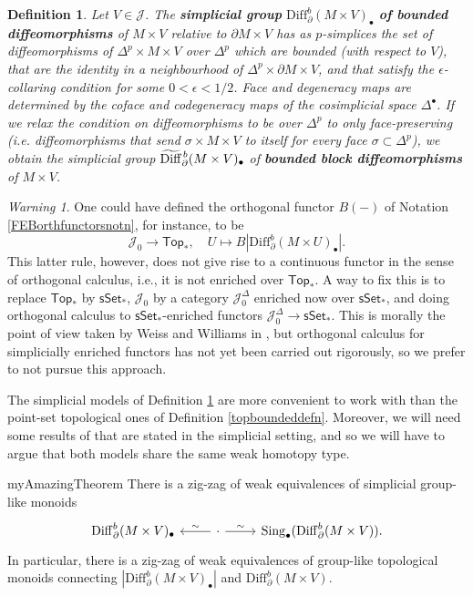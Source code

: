 \documentclass[a4paper, oneside]{amsart}
\newcommand{\diff}{\mathrm{Diff}}
\newcommand{\1}{\mathds{1}}
\newcommand{\Sing}{\operatorname{Sing}}
\newcommand{\sSet}{\mathsf{sSet}}
\newcommand{\Top}{\mathsf{Top}}
\newtheorem{defn}[thm]{Definition}
\theoremstyle{remark}
\newtheorem{warn}[thm]{Warning}
\theoremstyle{definition}
\newcommand{\bdiffb}{\widetilde{\mathrm{Diff}}{\vphantom{\mathrm{Diff}}}^{\hspace{1pt}b}}
\numberwithin{equation}{section}
\begin{document}
\begin{defn}\label{simplicialboundeddefn}
Let $V\in \mathcal J$. The \textbf{simplicial group} $\diff_\partial^b(M\times V)_\bullet$ \textbf{of bounded diffeomorphisms} of $M\times V$ relative to $\partial M\times V$ has as $p$-simplices the set of diffeomorphisms of $\Delta^p\times M\times V$ over $\Delta^p$ which are bounded (with respect to $V$), that are the identity in a neighbourhood of $\Delta^p\times \partial M\times V$, and that satisfy the $\epsilon$-collaring condition for some $0<\epsilon<1/2$. Face and degeneracy maps are determined by the coface and codegeneracy maps of the cosimplicial space $\Delta^\bullet$. If we relax the condition on diffeomorphisms to be over $\Delta^p$ to only face-preserving (i.e. diffeomorphisms that send $\sigma\times M\times V$ to itself for every face $\sigma\subset\Delta^p$), we obtain the simplicial group $\bdiffb_\partial(M\times V)_\bullet$ of \textbf{bounded block diffeomorphisms} of $M\times V$.
\end{defn}


\begin{warn}
    One could have defined the orthogonal functor $B(-)$ of Notation \ref{FEBorthfunctorsnotn}, for instance, to be
    $$
\mathcal J_0\longrightarrow \Top_*, \quad U\longmapsto B|\diff_\partial^b(M\times U)_\bullet|.
$$
This latter rule, however, does not give rise to a continuous functor in the sense of orthogonal calculus, i.e., it is not enriched over $\Top_*$. A way to fix this is to replace $\Top_*$ by $\sSet_*$, $\mathcal J_0$ by a category $\mathcal J_0^\Delta$ enriched now over $\sSet_*$, and doing orthogonal calculus to $\sSet_*$-enriched functors $\mathcal J_0^\Delta\to \sSet_*$. This is morally the point of view taken by Weiss and Williams in \cite{WWI}, but orthogonal calculus for simplicially enriched functors has not yet been carried out rigorously, so we prefer to not pursue this approach.
\end{warn}


The simplicial models of Definition \ref{simplicialboundeddefn} are more convenient to work with than the point-set topological ones of Definition \ref{topboundeddefn}. Moreover, we will need some results of \cite{WWI} that are stated in the simplicial setting, and so we will have to argue that both models share the same weak homotopy type. 

\begin{repproposition}{myAmazingTheorem}
    There is a zig-zag of weak equivalences of simplicial group-like monoids
    $$
    \begin{tikzcd}
       \diff^b_\partial(M\times V)_\bullet&\lar["\sim"']\cdot \rar["\sim"]&\Sing_\bullet(\diff_\partial^b(M\times V)).
    \end{tikzcd}
    $$
    In particular, there is a zig-zag of weak equivalences of group-like topological monoids connecting $|\diff^b_\partial(M\times V)_\bullet|$ and $\diff_\partial^b(M\times V)$.
\end{repproposition}
\end{document}
